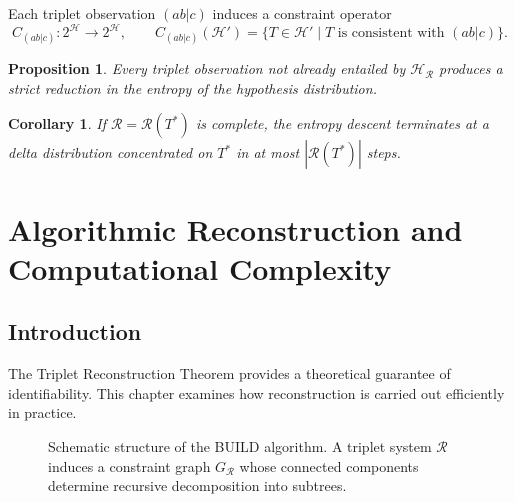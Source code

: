 \documentclass[12pt,a4paper,oneside]{book}
\numberwithin{equation}{chapter}
\theoremstyle{plain}
\newtheorem{proposition}[theorem]{Proposition}
\newtheorem{corollary}[theorem]{Corollary}
\theoremstyle{definition}
\theoremstyle{remark}
\begin{document}
Each triplet observation $(ab|c)$ induces a constraint operator
\[
C_{(ab|c)} : 2^{\mathcal{H}} \rightarrow 2^{\mathcal{H}}, \qquad
C_{(ab|c)}(\mathcal{H}') =
\{ T \in \mathcal{H}' \mid T \text{ is consistent with } (ab|c) \}.
\]

\begin{proposition}
\label{prop:entropy-decrease}
Every triplet observation not already entailed by $\mathcal{H}_\mathcal{R}$
produces a strict reduction in the entropy of the hypothesis
distribution.
\end{proposition}

\begin{corollary}
If $\mathcal{R} = \mathcal{R}(T^\ast)$ is complete, the entropy
descent terminates at a delta distribution concentrated on $T^\ast$
in at most $|\mathcal{R}(T^\ast)|$ steps.
\end{corollary}


\chapter[Algorithmic Reconstruction]{Algorithmic Reconstruction and Computational Complexity}
\label{ch:algorithms}

\section{Introduction}

The Triplet Reconstruction Theorem provides a theoretical guarantee
of identifiability. This chapter examines how reconstruction is
carried out efficiently in practice.

\begin{figure}[htbp]
\centering
{}
\caption{Schematic structure of the BUILD algorithm. A triplet system
$\mathcal{R}$ induces a constraint graph $G_{\mathcal{R}}$ whose
connected components determine recursive decomposition into subtrees.}
\label{fig:build-algorithm-schematic}
\end{figure}
\end{document}
